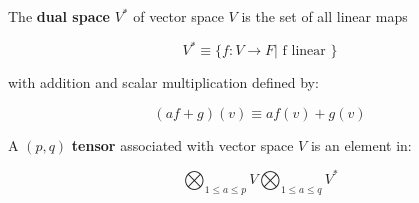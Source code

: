 \begin{defn}

    The \textbf{dual space} $V^*$ of vector space $V$ is the set of all linear maps

    $$V^* \equiv \{ f: V \to F | \text{ f linear } \}$$

    with addition and scalar multiplication defined by:

    $$ (af + g) (v) \equiv a f(v) + g(v) $$

\end{defn}

\begin{defn}


    A $(p, q)$ \textbf{tensor} associated with vector space $V$ is an element in:

    $$\bigotimes_{1 \le a \le p} V \bigotimes_{1 \le a \le q} V^* $$

\end{defn}